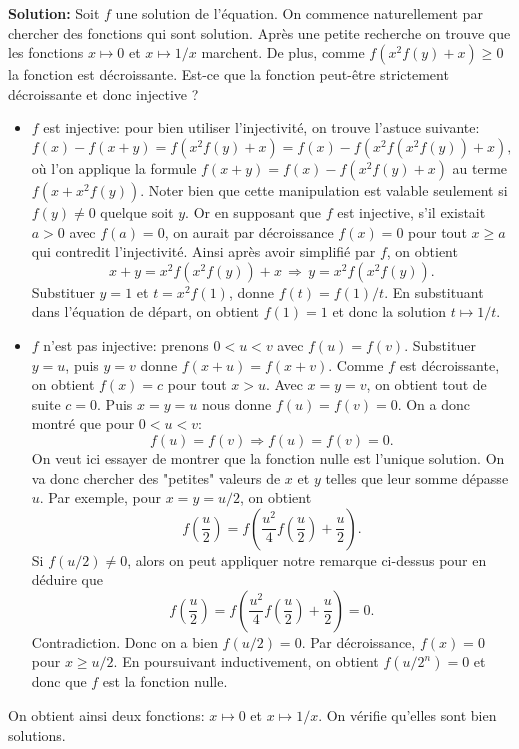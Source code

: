 \documentclass[language=german,style=solution]{smo}
\begin{document}
\begin{enumerate}
\textbf{Solution:}
Soit $f$ une solution de l'équation. On commence naturellement par chercher des fonctions qui sont solution. Après une petite recherche on trouve que les fonctions $x\mapsto 0$ et $x\mapsto 1/x$ marchent. De plus, comme $f(x^2f(y)+x)\geq 0$ la fonction est décroissante. Est-ce que la fonction peut-être strictement décroissante et donc injective ?
\begin{itemize}
\item $f$ est injective: pour bien utiliser l'injectivité, on trouve l'astuce suivante:
\[
f(x)-f(x+y)=f(x^2f(y)+x)=f(x)-f(x^2f(x^2f(y))+x),
\]
où l'on applique la formule $f(x+y)=f(x)-f(x^2f(y)+x)$ au terme $f(x+x^2f(y))$. Noter bien que cette manipulation est valable seulement si $f(y)\neq 0$ quelque soit $y$. Or en supposant que $f$ est injective, s'il existait $a>0$ avec $f(a)=0$, on aurait par décroissance $f(x)=0$ pour tout $x\geq a$ qui contredit l'injectivité.\newline
Ainsi après avoir simplifié par $f$, on obtient
\[
x+y=x^2f(x^2f(y))+x \,\Rightarrow\, y=x^2f(x^2f(y)).
\]
Substituer $y=1$ et $t=x^2f(1)$, donne $f(t)=f(1)/t$. En substituant dans l'équation de départ, on obtient $f(1)=1$ et donc la solution $t\mapsto 1/t$.
\item $f$ n'est pas injective: prenons $0<u<v$ avec $f(u)=f(v)$. Substituer $y=u$, puis $y=v$ donne $f(x+u)=f(x+v)$. Comme $f$ est décroissante, on obtient $f(x)=c$ pour tout $x>u$. Avec $x=y=v$, on obtient tout de suite $c=0$. Puis $x=y=u$ nous donne $f(u)=f(v)=0$. On a donc montré que pour $0<u<v$:
\[
f(u)=f(v)\Rightarrow f(u)=f(v)=0.
\]
On veut ici essayer de montrer que la fonction nulle est l'unique solution. On va donc chercher des "petites" valeurs de $x$ et $y$ telles que leur somme dépasse $u$. Par exemple, pour $x=y=u/2$, on obtient
\[
f\left(\frac{u}{2}\right)=f\left(\frac{u^2}{4}f\left(\frac{u}{2}\right)+\frac{u}{2}\right).
\]
Si $f(u/2)\neq 0$, alors on peut appliquer notre remarque ci-dessus pour en déduire que
\[
f\left(\frac{u}{2}\right)=f\left(\frac{u^2}{4}f\left(\frac{u}{2}\right)+\frac{u}{2}\right)=0.
\]
Contradiction. Donc on a bien $f(u/2)=0$. Par décroissance, $f(x)=0$ pour $x\geq u/2$. En poursuivant inductivement, on obtient $f(u/2^n)=0$ et donc que $f$ est la fonction nulle.
\end{itemize}
On obtient ainsi deux fonctions: $x\mapsto 0$ et $x\mapsto 1/x$. On vérifie qu'elles sont bien solutions.


\end{enumerate}
\end{document}
